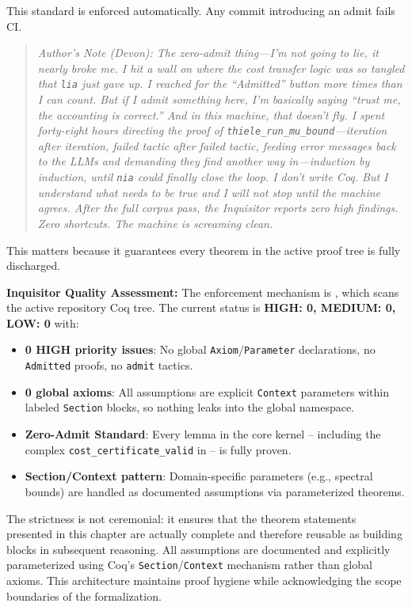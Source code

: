This standard is enforced automatically. Any commit introducing an admit fails CI.

\begin{quote}
\textit{Author's Note (Devon): The zero-admit thing---I'm not going to lie, it nearly broke me. I hit a wall on  where the cost transfer logic was so tangled that \texttt{lia} just gave up. I reached for the ``Admitted'' button more times than I can count. But if I admit something here, I'm basically saying ``trust me, the accounting is correct.'' And in this machine, that doesn't fly. I spent forty-eight hours directing the proof of \texttt{thiele\_run\_mu\_bound}---iteration after iteration, failed tactic after failed tactic, feeding error messages back to the LLMs and demanding they find another way in---induction by induction, until \texttt{nia} could finally close the loop. I don't write Coq. But I understand what needs to be true and I will not stop until the machine agrees. After the full corpus pass, the Inquisitor reports zero high findings. Zero shortcuts. The machine is screaming clean.}
\end{quote} This matters because it guarantees every theorem in the active proof tree is fully discharged.

\textbf{Inquisitor Quality Assessment:} The enforcement mechanism is , which scans the active repository Coq tree. The current status is \textbf{HIGH: 0, MEDIUM: 0, LOW: 0} with:
\begin{itemize}
    \item \textbf{0 HIGH priority issues}: No global \texttt{Axiom}/\texttt{Parameter} declarations, no \texttt{Admitted} proofs, no \texttt{admit} tactics.
    \item \textbf{0 global axioms}: All assumptions are explicit \texttt{Context} parameters within labeled \texttt{Section} blocks, so nothing leaks into the global namespace.
    \item \textbf{Zero-Admit Standard}: Every lemma in the core kernel -- including the complex \texttt{cost\_certificate\_valid} in  -- is fully proven.
    \item \textbf{Section/Context pattern}: Domain-specific parameters (e.g., spectral bounds) are handled as documented assumptions via parameterized theorems.
\end{itemize}

The strictness is not ceremonial: it ensures that the theorem statements presented in this chapter are actually complete and therefore reusable as building blocks in subsequent reasoning. All assumptions are documented and explicitly parameterized using Coq's \texttt{Section}/\texttt{Context} mechanism rather than global axioms. This architecture maintains proof hygiene while acknowledging the scope boundaries of the formalization.

